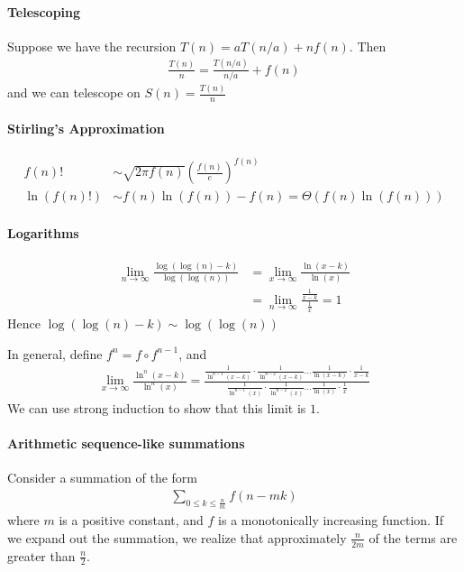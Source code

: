 \documentclass{article}
\begin{document}
\paragraph{Telescoping}\mbox{}
Suppose we have the recursion $T(n) = aT(n/a) + nf(n)$. Then 
\begin{align*}
	\frac{T(n)}{n}=\frac{T(n/a)}{n/a}+f(n)
\end{align*}
and we can telescope on $S(n)=\frac{T(n)}{n}$

\paragraph{Stirling's Approximation}
\begin{align*}
	f(n)!&\sim \sqrt{2\pi f(n)}\left(\frac{f(n)}{e}\right)^{f(n)}\\
	\ln(f(n)!)&\sim f(n)\ln(f(n)) - f(n) = \Theta(f(n)\ln(f(n)))
\end{align*}


\paragraph{Logarithms}
\begin{align*}
	\lim_{n\rightarrow \infty}\frac{\log(\log(n)-k)}{\log(\log(n))} &= \lim_{x\rightarrow \infty}\frac{\ln(x-k)}{\ln(x)}\\
	&= \lim_{n\rightarrow \infty}\frac{\frac{1}{x-k}}{\frac{1}{x}}=1
\end{align*}
Hence $\log(\log(n)-k)\sim \log(\log(n))$


In general, define $f^n=f\circ f^{n-1}$, and
\begin{align*}
	\lim_{x\rightarrow \infty} \frac{\ln^n(x-k)}{\ln^n(x)} = \frac{\frac{1}{\ln^{n-1}(x-k)}\cdot\frac{1}{\ln^{n-2}(x-k)}\dots \frac{1}{\ln(x-k)}\cdot \frac{1}{x-k}}{\frac{1}{\ln^{n-1}(x)}\cdot\frac{1}{\ln^{n-2}(x)}\dots \frac{1}{\ln(x)}\cdot \frac{1}{x}}
\end{align*}
We can use strong induction to show that this limit is $1$.

\paragraph{Arithmetic sequence-like summations}
Consider a summation of the form
\begin{align*}
	\sum_{0\leq k\leq \frac{n}{m}}f(n-mk)
\end{align*}
where $m$ is a positive constant, and $f$ is a monotonically increasing function. If we expand out the summation, we realize that approximately $\frac{n}{2m}$ of the terms are greater than $\frac{n}{2}$.
\end{document}
